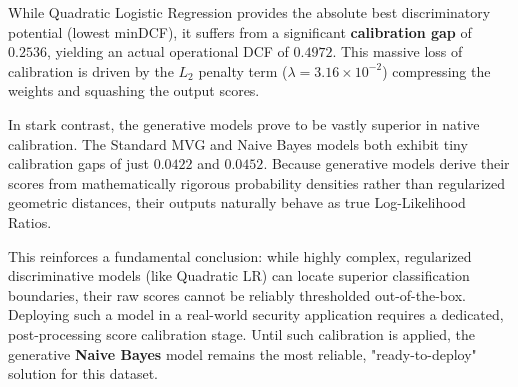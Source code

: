While Quadratic Logistic Regression provides the absolute best discriminatory potential (lowest minDCF), it suffers from a significant \textbf{calibration gap} of $0.2536$, yielding an actual operational DCF of $0.4972$. This massive loss of calibration is driven by the $L_2$ penalty term ($\lambda = 3.16 \times 10^{-2}$) compressing the weights and squashing the output scores. 

In stark contrast, the generative models prove to be vastly superior in native calibration. The Standard MVG and Naive Bayes models both exhibit tiny calibration gaps of just $0.0422$ and $0.0452$. Because generative models derive their scores from mathematically rigorous probability densities rather than regularized geometric distances, their outputs naturally behave as true Log-Likelihood Ratios. 

This reinforces a fundamental conclusion: while highly complex, regularized discriminative models (like Quadratic LR) can locate superior classification boundaries, their raw scores cannot be reliably thresholded out-of-the-box. Deploying such a model in a real-world security application requires a dedicated, post-processing score calibration stage. Until such calibration is applied, the generative \textbf{Naive Bayes} model remains the most reliable, "ready-to-deploy" solution for this dataset.